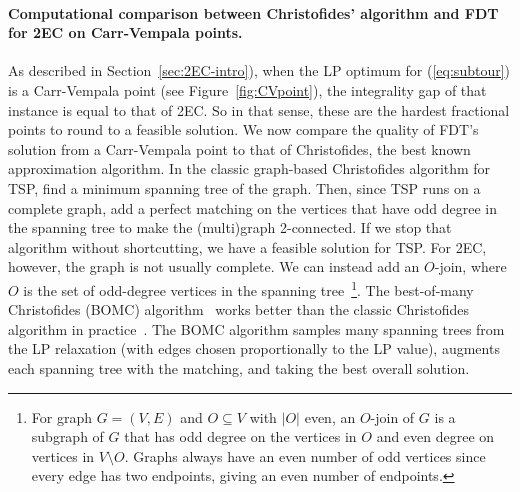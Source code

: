 \paragraph{Computational comparison between Christofides' algorithm and FDT for 2EC on Carr-Vempala points.} 

As described in Section~\ref{sec:2EC-intro}), when the LP optimum for (\ref{eq:subtour}) is a Carr-Vempala point (see Figure~\ref{fig:CVpoint}), the integrality gap of that instance is equal to that of 2EC. So in that sense, these are the hardest fractional points to round to a feasible solution. We now compare the quality of FDT's solution from a Carr-Vempala point to that of Christofides, the best known approximation algorithm.  In the classic graph-based Christofides algorithm for TSP, find a minimum spanning tree of the graph.  Then, since TSP runs on a complete graph, add a perfect matching on the vertices that have odd degree in the spanning tree to make the (multi)graph 2-connected. If we stop that algorithm without shortcutting, we have a feasible solution for TSP. For 2EC, however, the graph is not usually complete. We can instead add an $O$-join, where $O$ is the set of odd-degree vertices in the spanning tree~\footnote{For graph $G=(V,E)$ and $O\subseteq V$ with $|O|$ even, an $O$-join of $G$ is a subgraph of $G$ that has odd degree on the vertices in $O$ and even degree on vertices in $V\setminus O$. Graphs always have an even number of odd vertices since every edge has two endpoints, giving an even number of endpoints.}. The best-of-many Christofides (BOMC) algorithm~\cite{AKS15} works better than the classic Christofides algorithm in practice~\cite{GW17}.  The BOMC algorithm samples many spanning trees from the LP relaxation (with edges chosen proportionally to the LP value), augments each spanning tree with the matching, and taking the best overall solution.

